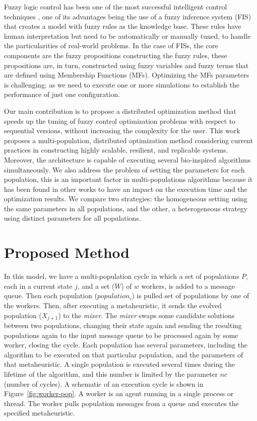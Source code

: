 \documentclass[runningheads]{llncs}
\begin{document}
Fuzzy logic control has been one of the most successful intelligent control
techniques \cite{Driankov2013Fuzzy},  one of its advantages being the use of a fuzzy
inference system (FIS) that creates a model with fuzzy rules as the
knowledge base. These rules have human interpretation but need to be
automatically or manually tuned, to handle the particularities of real-world
problems. In the case of FISs, the core components are the fuzzy propositions
constructing the fuzzy rules, these propositions are, in turn, constructed
using fuzzy variables and fuzzy terms that are defined using Membership Functions (MFs). Optimizing
the MFs parameters is challenging; as we need to execute one or more
simulations to establish the performance of just one configuration.

Our main contribution is to propose a distributed optimization method that
speeds up the tuning of fuzzy control optimization problems with respect to
sequential versions, without increasing the complexity for the user. This work
proposes a multi-population, distributed optimization method considering
current practices in constructing highly scalable, resilient, and replicable
systems. Moreover, the architecture is capable of executing several
bio-inspired algorithms simultaneously. We also address the problem of setting
the parameters for each population, this is an important factor in
multi-populations algorithms because it has been found in other works to have
an impact on the execution time and the optimization results. We compare two
strategies: the homogeneous setting using the same parameters in all
populations, and the other, a heterogeneous strategy using distinct parameters
for all populations.

\section{Proposed Method}

In this model, we have a  multi-population cycle in which a set of populations
$P$, each in a current state $j$, and a set ($W$) of $w$ workers, is added to a
message queue. Then each population ($population_{i}$) is pulled set of
populations by one of the workers. Then, after executing a metaheuristic, it
sends the evolved population ($X_{j+1}$) to the \emph{mixer}. The 
\emph{mixer} swaps some candidate solutions between two populations, changing
their state again and sending the resulting populations again to the input
message queue to be processed again by some worker, closing the cycle. Each
population has several parameters, including the algorithm to be executed on
that particular population, and the parameters of that metaheuristic. A single
population is executed several times during the lifetime of the algorithm, and
this number is limited by the parameter $nc$ (number of cycles).  A schematic
of an execution cycle is shown in Figure~\ref{fig:worker-pop}. A worker is an
agent running in a single process or thread. The worker pulls population
messages from a queue and executes the specified metaheuristic.
\end{document}
